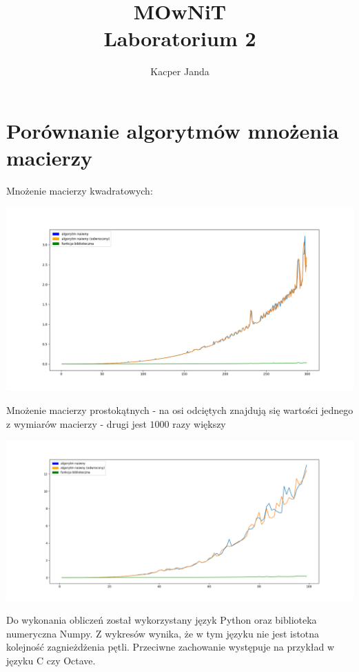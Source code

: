 \documentclass[11pt, a4paper]{article}
\begin{document}
\title{MOwNiT\\Laboratorium 2}
\author{Kacper Janda}
\date{}
\maketitle

\section{Porównanie algorytmów mnożenia macierzy}
Mnożenie macierzy kwadratowych:
\begin{center}
\includegraphics[scale = 0.32]{f1}
\end{center}

Mnożenie macierzy prostokątnych - na osi odciętych znajdują się wartości jednego z wymiarów macierzy - drugi jest \begin{math} 1000 \end{math} razy większy
\begin{center}
\includegraphics[scale = 0.32]{f2}
\end{center}
Do wykonania obliczeń został wykorzystany język Python oraz biblioteka numeryczna Numpy. Z wykresów wynika, że w tym języku nie jest istotna kolejność zagnieżdżenia pętli. Przeciwne zachowanie występuje na przykład w języku C czy Octave.
\end{document}

